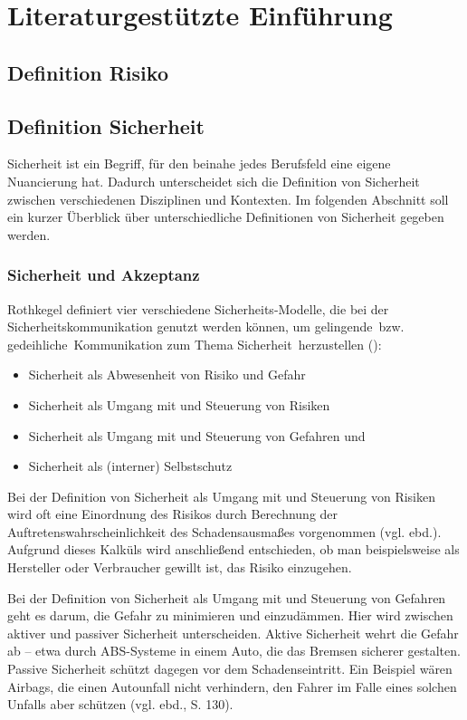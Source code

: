 \section{Literaturgestützte Einführung}

\subsection{Definition Risiko}

\subsection{Definition Sicherheit}
Sicherheit ist ein Begriff, für den beinahe jedes Berufsfeld eine eigene Nuancierung hat. Dadurch unterscheidet sich die Definition von Sicherheit zwischen verschiedenen Disziplinen und Kontexten. Im folgenden Abschnitt soll ein kurzer Überblick über unterschiedliche Definitionen von Sicherheit gegeben werden.

\subsubsection*{Sicherheit und Akzeptanz}

Rothkegel definiert vier verschiedene Sicherheits-Modelle, die bei der Sicherheitskommunikation genutzt werden können, um \glqq \glq gelingende\grq \, bzw. \glq gedeihliche\grq \, Kommunikation zum Thema Sicherheit\grqq \, herzustellen (\cite[125]{rothkegel2013sicherheitskommunikation}):
\begin{itemize}
  \item Sicherheit als Abwesenheit von Risiko und Gefahr
  \item Sicherheit als Umgang mit und Steuerung von Risiken
  \item Sicherheit als Umgang mit und Steuerung von Gefahren und
  \item Sicherheit als (interner) Selbstschutz
\end{itemize}

Bei der Definition von Sicherheit als Umgang mit und Steuerung von Risiken wird oft eine Einordnung des Risikos durch Berechnung der Auftretenswahrscheinlichkeit des Schadensausmaßes vorgenommen (vgl. ebd.). Aufgrund dieses Kalküls wird anschließend entschieden, ob man beispielsweise als Hersteller oder Verbraucher gewillt ist, das Risiko einzugehen.

Bei der Definition von Sicherheit als Umgang mit und Steuerung von Gefahren geht es darum, die Gefahr zu minimieren und einzudämmen. Hier wird zwischen aktiver und passiver Sicherheit unterscheiden. Aktive Sicherheit wehrt die Gefahr ab -- etwa durch ABS-Systeme in einem Auto, die das Bremsen sicherer gestalten. Passive Sicherheit schützt dagegen vor dem Schadenseintritt. Ein Beispiel wären Airbags, die einen Autounfall nicht verhindern, den Fahrer im Falle eines solchen Unfalls aber schützen (vgl. ebd., S. 130).

